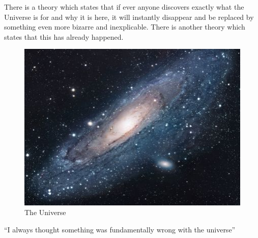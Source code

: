 \documentclass{book}
\begin{document}
There is a theory which states that if ever anyone discovers exactly what the Universe is for and why it is here, it will instantly disappear and be replaced by something even more bizarre and inexplicable.
There is another theory which states that this has already happened.

\begin{figure}[h!]
\centering
\includegraphics[scale=1.7]{universe}
\caption{The Universe}
\label{fig:universe}
\end{figure}

``I always thought something was fundamentally wrong with the universe'' \citep{adams1995hitchhiker}



\end{document}
